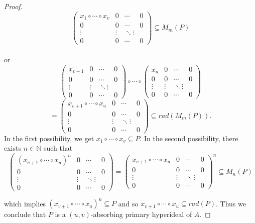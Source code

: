 \documentclass[10pt,a4paper]{amsart}
\begin{document}
\begin{proof}
\[\begin{pmatrix}
x_1 \circ \cdots \circ x_v & 0 & \cdots & 0\\
0 & 0 & \cdots & 0\\
\vdots& \vdots & \ddots \vdots\\
0 & 0 & \cdots & 0
\end{pmatrix}
\subseteq M_m(P)\]\\
or 
\[ \begin{pmatrix}
x_{v+1} & 0 & \cdots & 0\\
0 & 0 & \cdots & 0\\
\vdots& \vdots & \ddots \vdots\\
0 & 0 & \cdots & 0
\end{pmatrix} 
\circ \cdots \circ
\begin{pmatrix}
x_u & 0 & \cdots & 0\\
0 & 0 & \cdots & 0\\
\vdots& \vdots & \ddots \vdots\\
0 & 0 & \cdots & 0
\end{pmatrix}\]
\[=
\begin{pmatrix}
x_{v+1} \circ \cdots \circ x_u & 0 & \cdots & 0\\
0 & 0 & \cdots & 0\\
\vdots& \vdots & \ddots \vdots\\
0 & 0 & \cdots & 0
\end{pmatrix}
\subseteq rad(M_m(P)).\]
In the first possibility, we get $x_1 \circ \cdots \circ x_v \subseteq P$. 
In the second possibility, there exists $n \in \mathbb{N}$ such that 
\[\begin{pmatrix}
(x_{v+1} \circ \cdots \circ x_u)^n & 0 & \cdots & 0\\
0 & 0 & \cdots & 0\\
\vdots& \vdots & \ddots \vdots\\
0 & 0 & \cdots & 0
\end{pmatrix}=
\begin{pmatrix}
x_{v+1} \circ \cdots \circ x_u & 0 & \cdots & 0\\
0 & 0 & \cdots & 0\\
\vdots& \vdots & \ddots \vdots\\
0 & 0 & \cdots & 0
\end{pmatrix}^n \subseteq M_n(P)\]

which implies $(x_{v+1} \circ \cdots \circ x_u)^n  \subseteq P$ and so $x_{v+1} \circ \cdots \circ x_u \subseteq rad(P)$. Thus we conclude that  $P$ is a $(u,v)$-absorbing primary hyperideal of $A$. 
\end{proof}
\end{document}

